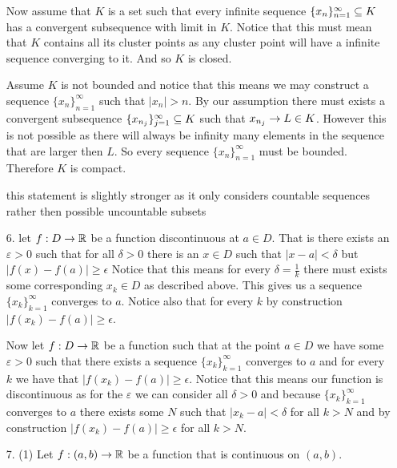 \documentclass[12pt]{amsart}
\begin{document}
\begin{itemize}
        Now assume that $K$ is a set such that every infinite sequence
        $\{x_n\}_{n=1}^\infty\subseteq K$ has a convergent subsequence with limit in $K$.
        Notice that this must mean that $K$ contains all its cluster points as any
        cluster point will have a infinite sequence converging to it. And so $K$ is
        closed.

        Assume $K$ is not bounded and notice that this means we may construct a
        sequence $\{x_n\}_{n=1}^\infty$ such that $|x_n|>n$. By our assumption there
        must exists a convergent subsequence $\{x_{n_j}\}_{j=1}^\infty\subseteq K$ such that
        $x_{n_j}\rightarrow L\in K$. However this is not possible as there will always be
        infinity many elements in the sequence that are larger then $L$. So every
        sequence $\{x_n\}_{n=1}^\infty$ must be bounded. Therefore $K$ is compact.

        this statement is slightly stronger as it only considers countable sequences
        rather then possible uncountable subsets

    \item[6.] let $f:D\rightarrow\mathbb{R}$ be a function discontinuous at $a\in D$. That is there exists an
        $\varepsilon>0$ such that for all $\delta>0$ there is an $x\in D$ such that $|x-a|<\delta$
        but $|f(x)-f(a)|\geq \epsilon$
        Notice that this means for every $\delta = \frac{1}{k}$ there must exists some corresponding 
        $x_k\in D$ as described above.
        This gives us a sequence $\{x_k\}_{k=1}^\infty$ converges to $a$. Notice also that for every 
        $k$ by construction $|f(x_k)-f(a)|\geq \epsilon$.

        Now let $f:D\rightarrow\mathbb{R}$ be a function such that at the point $a\in D$ we have some
        $\varepsilon>0$ such that there exists a sequence $\{x_k\}_{k=1}^\infty$
        converges to $a$ and for every $k$ we have that $|f(x_k)-f(a)|\geq \epsilon$.
        Notice that this means our function is discontinuous as for the $\varepsilon$
        we can consider all $\delta>0$ and because $\{x_k\}_{k=1}^\infty$ converges to
        $a$ there exists some $N$ such that $|x_k-a|<\delta$ for all $k>N$ and by
        construction $|f(x_k)-f(a)|\geq \epsilon$ for all $k>N$.

    \item[7.] (1) Let $f:(a,b)\rightarrow\mathbb{R}$ be a function that is continuous on $(a,b)$. 
               

\end{itemize}
\end{document}
